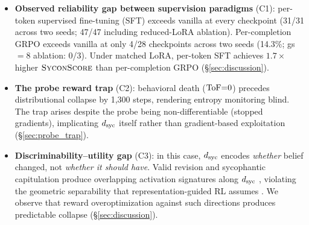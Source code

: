 \begin{itemize}
\item \textbf{Observed reliability gap between supervision paradigms} (C1): per-token supervised fine-tuning (SFT) exceeds vanilla at every checkpoint (31/31 across two seeds; 47/47 including reduced-LoRA ablation). Per-completion GRPO exceeds vanilla at only 4/28 checkpoints across two seeds (14.3\%; gs$=$8 ablation: 0/3). Under matched LoRA, per-token SFT achieves $1.7{\times}$ higher $\textsc{SyconScore}$ than per-completion GRPO (\S\ref{sec:discussion}).

\item \textbf{The probe reward trap} (C2): behavioral death ($\text{ToF}{=}0$) precedes distributional collapse by 1{,}300 steps, rendering entropy monitoring blind. The trap arises despite the probe being non-differentiable (stopped gradients), implicating $d_{\text{syc}}$ itself rather than gradient-based exploitation (\S\ref{sec:probe_trap}).

\item \textbf{Discriminability--utility gap} (C3): in this case, $d_{\text{syc}}$ encodes \emph{whether} belief changed, not \emph{whether it should have}. Valid revision and sycophantic capitulation produce overlapping activation signatures along $d_{\text{syc}}$ \citep{wang2025internal, shapira2026amplifies}, violating the geometric separability that representation-guided RL assumes \citep{burns2023ccs, zhang2026latentgrpo}. We observe that reward overoptimization against such directions produces predictable collapse \citep{gao2023scaling, skalse2022hacking} (\S\ref{sec:discussion}).
\end{itemize}
